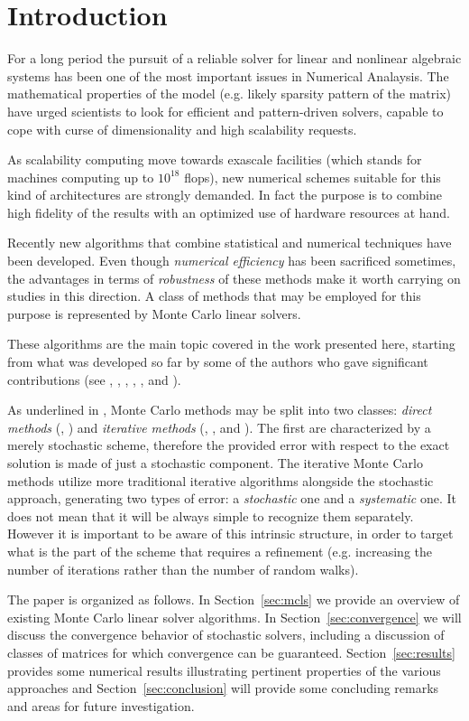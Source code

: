 \section{Introduction}
\label{sec:intro}

For a long period the
pursuit of a reliable solver for linear and nonlinear algebraic systems has
been one of the most important issues in Numerical Analaysis. The
mathematical properties of the model (e.g. likely sparsity pattern of the
matrix) have urged scientists to look for efficient and pattern-driven
solvers, capable to cope with curse of dimensionality and high scalability
requests.

As scalability computing move towards exascale facilities (which stands for
machines computing up to $10^{18}$ flops), new numerical schemes suitable for
this
kind of architectures are strongly demanded. In fact the purpose is to combine
high
fidelity of the results with an optimized use of hardware resources at hand.

Recently new algorithms that combine statistical and numerical techniques have
been developed. Even though \textit{numerical efficiency} has been sacrificed
sometimes, the advantages in terms of \textit{robustness} of these methods make
it worth carrying on studies in this direction.
A class of methods that may be employed for this purpose is represented by
Monte Carlo linear solvers.

These algorithms are the main topic covered in the work presented here,
starting from what was developed so far by some of
the authors who gave significant contributions (see \cite{Hal1962},
\cite{Hal1994},
\cite{DA1998}, \cite{DVA2001}, \cite{AADBTW2005},\cite{ESW2013} and
\cite{EMSH2014}). \newline

As underlined in \cite{DA1998}, Monte Carlo methods may be split into two
classes: \textit{direct methods} (\cite{DA1998}, \cite{DVA2001}) and
\textit{iterative methods} (\cite{Hal1962},
\cite{Hal1994}, \cite{ESW2013}
and \cite{EMSH2014}). The first are characterized by a merely stochastic
scheme,
therefore the provided error with respect to the exact solution is made of
just a stochastic component. The iterative Monte Carlo methods utilize more
traditional iterative algorithms alongside the stochastic approach,
generating two types of error: a
\textit{stochastic} one and a \textit{systematic} one. It does not
mean
that
it will be always simple to recognize them separately. However it is important
to
be
aware of this intrinsic structure, in order to target what is the part of the
scheme that requires a refinement (e.g. increasing the number of iterations
rather than the number of random walks).

The paper is organized as follows.
In Section~\ref{sec:mcls} we provide an overview of existing Monte Carlo
linear solver algorithms.
In Section~\ref{sec:convergence} we will discuss the convergence behavior
of stochastic solvers, including a discussion of classes of matrices for
which convergence can be guaranteed.
Section~\ref{sec:results} provides some numerical results illustrating
pertinent properties of the various approaches and Section~\ref{sec:conclusion}
will provide some concluding remarks and areas for future investigation.

